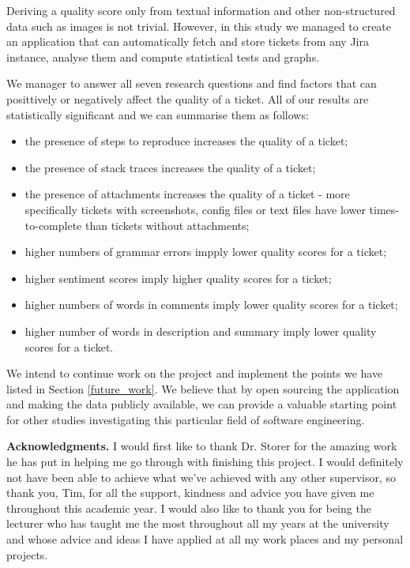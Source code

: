 \documentclass{mpaper}
\begin{document}
Deriving a quality score only from textual information and other non-structured data such as images is not trivial. 
However, in this study we managed to create an application that can automatically fetch and store tickets from any 
Jira instance, analyse them and compute statistical tests and graphs.

We manager to answer all seven research questions and find factors that can posittively or 
negatively affect the quality of a ticket. All of our results are statistically significant and we can summarise 
them as follows:
\begin{itemize}
  \item the presence of steps to reproduce increases the quality of a ticket;
  \item the presence of stack traces increases the quality of a ticket;
  \item the presence of attachments increases the quality of a ticket - more specifically tickets with screenshots, 
  config files or text files have lower times-to-complete than tickets without attachments;
  \item higher numbers of grammar errors impply lower quality scores for a ticket;
  \item higher sentiment scores imply higher quality scores for a ticket;
  \item higher numbers of words in comments imply lower quality scores for a ticket;
  \item higher number of words in description and summary imply lower quality scores for a ticket.
\end{itemize}

We intend to continue work on the project and implement the points we have listed in Section \ref{future_work}. We believe
that by open sourcing the application and making the data publicly available, we can provide a valuable starting point 
for other studies investigating this particular field of software engineering.

\vskip8pt \noindent
{\bf Acknowledgments.}
I would first like to thank Dr. Storer for the amazing work he has put in helping me go through with finishing 
this project. I would definitely not have been able to achieve what we've achieved with any other supervisor, so 
thank you, Tim, for all the support, kindness and advice you have given me throughout this academic year. I would 
also like to thank you for being the lecturer who has taught me the most throughout all my years at the university
and whose advice and ideas I have applied at all my work places and my personal projects.
\end{document}
